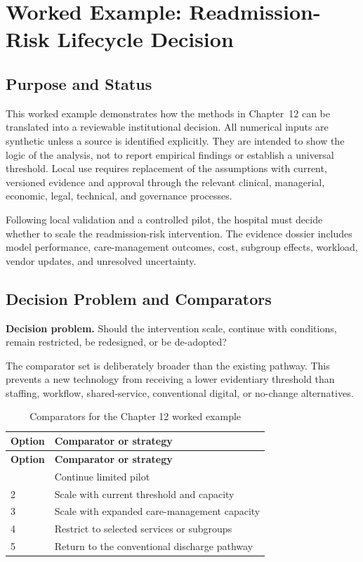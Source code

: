 \section{Worked Example: Readmission-Risk Lifecycle Decision}
\label{sec:comp-ch12-worked-example}

\subsection{Purpose and Status}
This worked example demonstrates how the methods in Chapter~12 can be
translated into a reviewable institutional decision. All numerical inputs are
synthetic unless a source is identified explicitly. They are intended to show the
logic of the analysis, not to report empirical findings or establish a universal
threshold. Local use requires replacement of the assumptions with current,
versioned evidence and approval through the relevant clinical, managerial,
economic, legal, technical, and governance processes.

Following local validation and a controlled pilot, the hospital must decide whether to scale the readmission-risk intervention. The evidence dossier includes model performance, care-management outcomes, cost, subgroup effects, workload, vendor updates, and unresolved uncertainty. 

\subsection{Decision Problem and Comparators}
\textbf{Decision problem.} Should the intervention scale, continue with conditions, remain restricted, be redesigned, or be de-adopted?

The comparator set is deliberately broader than the existing pathway. This prevents
a new technology from receiving a lower evidentiary threshold than staffing,
workflow, shared-service, conventional digital, or no-change alternatives.

\begin{longtable}{@{}p{}p{}@{}}
\caption{Comparators for the Chapter 12 worked example}
\label{tab:comp-ch12-comparators}\\
\toprule
\textbf{Option} & \textbf{Comparator or strategy} \\
\midrule
\endfirsthead
\toprule
\textbf{Option} & \textbf{Comparator or strategy} \\
\midrule
\endhead
\bottomrule
\endlastfoot
1 & Continue limited pilot \\
2 & Scale with current threshold and capacity \\
3 & Scale with expanded care-management capacity \\
4 & Restrict to selected services or subgroups \\
5 & Return to the conventional discharge pathway \\
\end{longtable}

